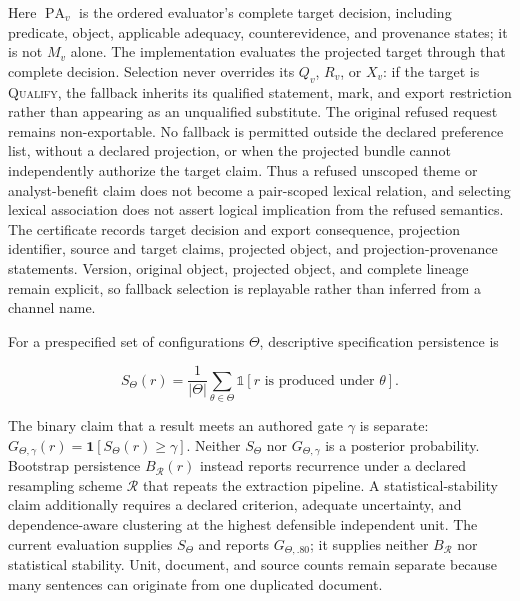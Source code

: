 \documentclass[manuscript,screen,review]{acmart}
\begin{document}
Here $\operatorname{PA}_v$ is the ordered evaluator's complete target decision, including predicate, object, applicable adequacy, counterevidence, and provenance states; it is not $M_v$ alone. The implementation evaluates the projected target through that complete decision. Selection never overrides its $Q_v$, $R_v$, or $X_v$: if the target is \textsc{Qualify}, the fallback inherits its qualified statement, mark, and export restriction rather than appearing as an unqualified substitute. The original refused request remains non-exportable. No fallback is permitted outside the declared preference list, without a declared projection, or when the projected bundle cannot independently authorize the target claim. Thus a refused unscoped theme or analyst-benefit claim does not become a pair-scoped lexical relation, and selecting lexical association does not assert logical implication from the refused semantics. The certificate records target decision and export consequence, projection identifier, source and target claims, projected object, and projection-provenance statements. Version, original object, projected object, and complete lineage remain explicit, so fallback selection is replayable rather than inferred from a channel name.

For a prespecified set of configurations $\Theta$, descriptive specification persistence is

\begin{equation}
S_{\Theta}(r)=\frac{1}{|\Theta|}\sum_{\theta\in\Theta}
\mathbb{1}[r\text{ is produced under }\theta].
\end{equation}

The binary claim that a result meets an authored gate $\gamma$ is separate: $G_{\Theta,\gamma}(r)=\mathbf{1}[S_{\Theta}(r)\geq\gamma]$. Neither $S_{\Theta}$ nor $G_{\Theta,\gamma}$ is a posterior probability. Bootstrap persistence $B_{\mathcal{R}}(r)$ instead reports recurrence under a declared resampling scheme $\mathcal{R}$ that repeats the extraction pipeline. A statistical-stability claim additionally requires a declared criterion, adequate uncertainty, and dependence-aware clustering at the highest defensible independent unit. The current evaluation supplies $S_{\Theta}$ and reports $G_{\Theta,.80}$; it supplies neither $B_{\mathcal{R}}$ nor statistical stability. Unit, document, and source counts remain separate because many sentences can originate from one duplicated document.
\end{document}
